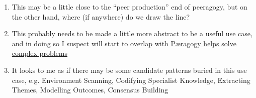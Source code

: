 \begin{enumerate}
\item
  This may be a little close to the ``peer production'' end of
  peeragogy, but on the other hand, where (if anywhere) do we draw the
  line?
\item
  This probably needs to be made a little more abstract to be a useful
  use case, and in doing so I suspect will start to overlap with
  \href{http://socialmediaclassroom.com/host/peeragogy/forum/patterns-and-use-cases\#comment-1509}{Pæragogy
  helps solve complex problems}
\item
  It looks to me as if there may be some candidate patterns buried in
  this use case, e.g. Environment Scanning, Codifying Specialist
  Knowledge, Extracting Themes, Modelling Outcomes, Consensus Building
\end{enumerate}
